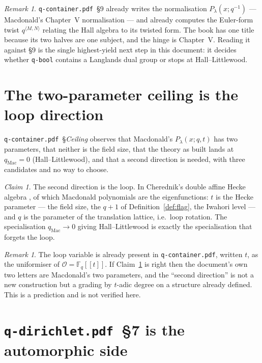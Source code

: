 \documentclass[11pt,a4paper]{article}
\theoremstyle{definition}
\theoremstyle{remark}
\newtheorem{remark}[theorem]{Remark}
\newtheorem{claim}[theorem]{Claim}
\newcommand{\FF}{\mathbb{F}}
\newcommand{\OO}{\mathcal{O}}
\begin{document}
\begin{remark}
\texttt{q-container.pdf}~\S9 already writes the normalisation
$P_\lambda(x; q^{-1})$ --- Macdonald's Chapter~V normalisation --- and already
computes the Euler-form twist $q^{\langle M,N\rangle}$ relating the Hall algebra
to its twisted form. The book has one title because its two halves are one
subject, and the hinge is Chapter~V. Reading it against \S9 is the single
highest-yield next step in this document: it decides whether \texttt{q-bool}
contains a Langlands dual group or stops at Hall--Littlewood.
\end{remark}

\section{The two-parameter ceiling is the loop direction}\label{sec:daha}

\texttt{q-container.pdf}~\S\emph{Ceiling} observes that Macdonald's
$P_\lambda(x;q,t)$ has two parameters, that neither is the field size, that the
theory as built lands at $q_{\mathrm{Mac}} = 0$ (Hall--Littlewood), and that a
second direction is needed, with three candidates and no way to choose.

\begin{claim}\label{cl:daha}
The second direction is the loop. In Cherednik's double affine Hecke algebra
\cite{Cherednik}, of which Macdonald polynomials are the eigenfunctions:
$t$ is the Hecke parameter --- the field size, the $q+1$ of
Definition~\ref{def:flag}, the Iwahori level --- and $q$ is the parameter of the
translation lattice, i.e.\ loop rotation. The specialisation
$q_{\mathrm{Mac}} \to 0$ giving Hall--Littlewood is exactly the specialisation
that forgets the loop.
\end{claim}

\begin{remark}
The loop variable is already present in \texttt{q-container.pdf}, written $t$,
as the uniformiser of $\OO = \FF_q[[t]]$. If Claim~\ref{cl:daha} is right then
the document's own two letters are Macdonald's two parameters, and the
``second direction'' is not a new construction but a grading by $t$-adic degree
on a structure already defined. This is a prediction and is not verified here.
\end{remark}

\section{\texttt{q-dirichlet.pdf}~\S7 is the automorphic side}\label{sec:autom}
\end{document}
